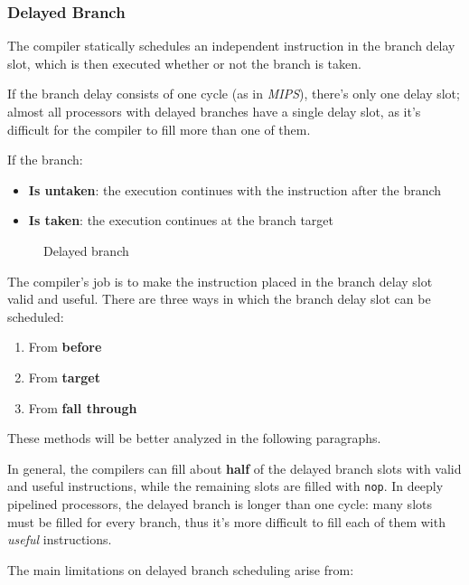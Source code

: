 \documentclass[english]{article}
\begin{document}
\subsubsection{Delayed Branch}
\label{sec:delayed-branch}

The compiler statically schedules an independent instruction in the branch delay slot, which is then executed whether or not the branch is taken.

If the branch delay consists of one cycle (as in \textit{MIPS}), there's only one delay slot;
almost all processors with delayed branches have a single delay slot, as it's difficult for the compiler to fill more than one of them.

If the branch:

\begin{itemize}
  \item \textbf{Is untaken}: the execution continues with the instruction after the branch
  \item \textbf{Is taken}: the execution continues at the branch target
\end{itemize}

\begin{figure}[htbp]
  \bigskip
  \centering
  \caption{Delayed branch}
  \label{fig:delayed-branch}
  \bigskip
\end{figure}

The compiler's job is to make the instruction placed in the branch delay slot valid and useful.
There are three ways in which the branch delay slot can be scheduled:

\begin{enumerate}
  \item From \textbf{before}
  \item From \textbf{target}
  \item From \textbf{fall through}
\end{enumerate}

These methods will be better analyzed in the following paragraphs.

\bigskip
In general, the compilers can fill about \textbf{half} of the delayed branch slots with valid and useful instructions, while the remaining slots are filled with \texttt{nop}.
In deeply pipelined processors, the delayed branch is longer than one cycle: many slots must be filled for every branch, thus it's more difficult to fill each of them with \textit{useful} instructions.

\bigskip
The main limitations on delayed branch scheduling arise from:
\end{document}
